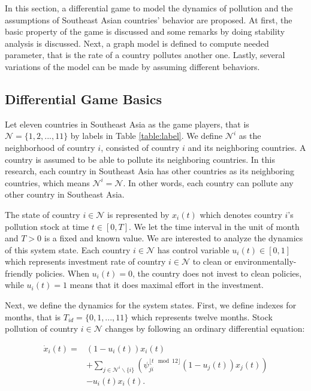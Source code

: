 \documentclass[a4paper,fleqn]{cas-dc}
\begin{document}
In this section, a differential game to model the dynamics of pollution and the assumptions of Southeast Asian countries' behavior are proposed. At first, the basic property of the game is discussed and some remarks by doing stability analysis is discussed. Next, a graph model is defined to compute needed parameter, that is the rate of a country pollutes another one. Lastly, several variations of the model can be made by assuming different behaviors.

\subsection{Differential Game Basics}

Let eleven countries in Southeast Asia as the game players, that is $\mathcal{N}=\{1,2,...,11\}$ by labels in Table \ref{table:label}. We define $\mathcal{N}^i$ as the neighborhood of country $i$, consisted of country $i$ and its neighboring countries. A country is assumed to be able to pollute its neighboring countries. In this research, each country in Southeast Asia has other countries as its neighboring countries, which means $\mathcal{N}^i=\mathcal{N}$. In other words, each country can pollute any other country in Southeast Asia.

The state of country $i\in\mathcal{N}$ is represented by $x_i(t)$ which denotes country $i$'s pollution stock at time $t\in[0,T]$. We let the time interval in the unit of month and $T>0$ is a fixed and known value. We are interested to analyze the dynamics of this system state. Each country $i\in\mathcal{N}$ has control variable $u_i(t)\in [0,1]$ which represents investment rate of country $i\in\mathcal{N}$ to clean or environmentally-friendly policies. When $u_i(t)=0$, the country does not invest to clean policies, while $u_i(t)=1$ means that it does maximal effort in the investment.

Next, we define the dynamics for the system states. First, we define indexes for months, that is $T_{id}=\{0,1,...,11\}$ which represents twelve months. Stock pollution of country $i\in\mathcal{N}$ changes by following an ordinary differential equation:

\begin{equation} \label{equation:pollution dynamics}
    \begin{split}
    \dot{x}_i(t) = &(1-u_i(t))x_i(t) \\
    &+ \sum_{j\in \mathcal{N}^i \backslash \{i\}}{\left(\psi_{ji}^{\lfloor t \mod12 \rfloor} (1-u_j(t))x_j(t)\right)} \\
    &- u_i(t)x_i(t).
\end{split}
\end{equation}
\end{document}
